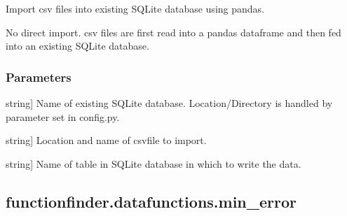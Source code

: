 \documentclass[letterpaper,10pt,english]{sphinxmanual}
\begin{document}
\begin{fulllineitems}
\label{\detokenize{_autosummary/functionfinder.datafunctions.csv2sql_pandas:functionfinder.datafunctions.csv2sql_pandas}}
\pysigstartsignatures
{}
\pysigstopsignatures
\sphinxAtStartPar
Import csv files into existing SQLite database using pandas.

\sphinxAtStartPar
No direct import. csv files are first read into a pandas dataframe and
then fed into an existing SQLite database.


\subsubsection{Parameters}
\label{\detokenize{_autosummary/functionfinder.datafunctions.csv2sql_pandas:parameters}}\begin{description}
\sphinxlineitem{existing\_db}{[}string{]}
\sphinxAtStartPar
Name of existing SQLite database. Location/Directory is handled by
parameter set in config.py.

\sphinxlineitem{csv\_toadd}{[}string{]}
\sphinxAtStartPar
Location and name of csv\sphinxhyphen{}file to import.

\sphinxlineitem{tablename}{[}string{]}
\sphinxAtStartPar
Name of table in SQLite database in which to write the data.

\end{description}

\end{fulllineitems}


\sphinxstepscope


\subsection{functionfinder.datafunctions.min\_error}
\label{\detokenize{_autosummary/functionfinder.datafunctions.min_error:functionfinder-datafunctions-min-error}}\label{\detokenize{_autosummary/functionfinder.datafunctions.min_error::doc}}
\end{document}
